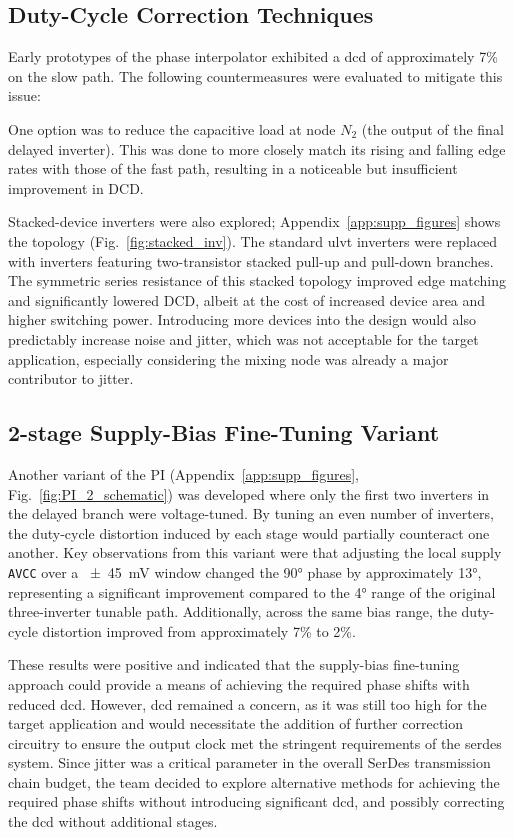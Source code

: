 \subsection{Duty-Cycle Correction Techniques}\label{sec:dcc}

Early prototypes of the phase interpolator exhibited a \gls{dcd} of approximately 7\% on the slow path. The following countermeasures were evaluated to mitigate this issue:

One option was to reduce the capacitive load at node $N_2$ (the output of the final delayed inverter). This was done to more closely match its rising and falling edge rates with those of the fast path, resulting in a noticeable but insufficient improvement in DCD.

Stacked-device inverters were also explored; Appendix~\ref{app:supp_figures} shows the topology (Fig.~\ref{fig:stacked_inv}). The standard \gls{ulvt} inverters were replaced with inverters featuring two-transistor stacked pull-up and pull-down branches. The symmetric series resistance of this stacked topology improved edge matching and significantly lowered DCD, albeit at the cost of increased device area and higher switching power. Introducing more devices into the design would also predictably increase noise and jitter, which was not acceptable for the target application, especially considering the mixing node was already a major contributor to jitter.


\subsection{2-stage Supply-Bias Fine-Tuning Variant}\label{sec:avcc_finetune}

Another variant of the PI (Appendix~\ref{app:supp_figures}, Fig.~\ref{fig:PI_2_schematic}) was developed where only the first two inverters in the delayed branch were voltage-tuned. By tuning an even number of inverters, the duty‑cycle distortion induced by each stage would partially counteract one another. Key observations from this variant were that adjusting the local supply \texttt{AVCC} over a \SI{\pm45}{\milli\volt} window changed the \ang{90} phase by approximately \ang{13}, representing a significant improvement compared to the \ang{4} range of the original three-inverter tunable path. Additionally, across the same bias range, the duty-cycle distortion improved from approximately 7\% to 2\%.

These results were positive and indicated that the supply-bias fine-tuning approach could provide a means of achieving the required phase shifts with reduced \gls{dcd}. However, \gls{dcd} remained a concern, as it was still too high for the target application and would necessitate the addition of further correction circuitry to ensure the output clock met the stringent requirements of the \gls{serdes} system. Since jitter was a critical parameter in the overall SerDes transmission chain budget, the team decided to explore alternative methods for achieving the required phase shifts without introducing significant \gls{dcd}, and possibly correcting the \gls{dcd} without additional stages.


